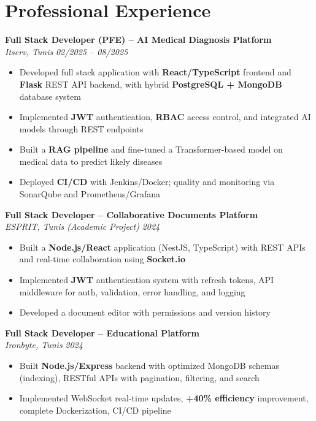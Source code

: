 \documentclass[10pt,a4paper]{article}
\begin{document}
\vspace{6pt}

\section*{Professional Experience}
{\small

\textbf{Full Stack Developer (PFE) -- AI Medical Diagnosis Platform}\\[1pt]
\textit{Itserv, Tunis} \hfill \textit{02/2025 -- 08/2025}
\begin{itemize}
  \item Developed full stack application with \textbf{React/TypeScript} frontend and \textbf{Flask} REST API backend, with hybrid \textbf{PostgreSQL + MongoDB} database system
  \item Implemented \textbf{JWT} authentication, \textbf{RBAC} access control, and integrated AI models through REST endpoints
  \item Built a \textbf{RAG pipeline} and fine-tuned a Transformer-based model on medical data to predict likely diseases
  \item Deployed \textbf{CI/CD} with Jenkins/Docker; quality and monitoring via SonarQube and Prometheus/Grafana
\end{itemize}

\vspace{3pt}
\textbf{Full Stack Developer -- Collaborative Documents Platform}\\[1pt]
\textit{ESPRIT, Tunis (Academic Project)} \hfill \textit{2024}
\begin{itemize}
  \item Built a \textbf{Node.js/React} application (NestJS, TypeScript) with REST APIs and real-time collaboration using \textbf{Socket.io}
  \item Implemented \textbf{JWT} authentication system with refresh tokens, API middleware for auth, validation, error handling, and logging
  \item Developed a document editor with permissions and version history
\end{itemize}

\vspace{3pt}
\textbf{Full Stack Developer -- Educational Platform}\\[1pt]
\textit{Ironbyte, Tunis} \hfill \textit{2024}
\begin{itemize}
  \item Built \textbf{Node.js/Express} backend with optimized MongoDB schemas (indexing), RESTful APIs with pagination, filtering, and search
  \item Implemented WebSocket real-time updates, \textbf{+40\% efficiency} improvement, complete Dockerization, CI/CD pipeline
\end{itemize}

}
\end{document}
